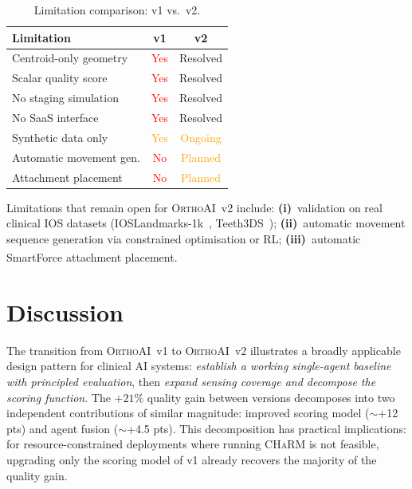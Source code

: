 \documentclass[10pt,twocolumn]{article}
\newcommand{\orthoai}{\textsc{OrthoAI}}
\newcommand{\charm}{\textsc{CHaRM}}
\newcommand{\vone}{\orthoai{}~v1}
\newcommand{\vtwo}{\orthoai{}~v2}
\begin{document}
\begin{table}[H]
\centering
\caption{Limitation comparison: v1 vs.\ v2.}
\label{tab:limitations}
\small
\begin{tabular}{p{2.8cm}cc}
\toprule
Limitation & v1 & v2 \\
\midrule
Centroid-only geometry    & \textcolor{red}{Yes} & \textcolor{green!60!black}{Resolved} \\
Scalar quality score      & \textcolor{red}{Yes} & \textcolor{green!60!black}{Resolved} \\
No staging simulation     & \textcolor{red}{Yes} & \textcolor{green!60!black}{Resolved} \\
No SaaS interface         & \textcolor{red}{Yes} & \textcolor{green!60!black}{Resolved} \\
Synthetic data only       & \textcolor{orange}{Yes} & \textcolor{orange}{Ongoing} \\
Automatic movement gen.   & \textcolor{red}{No} & \textcolor{orange}{Planned} \\
Attachment placement      & \textcolor{red}{No} & \textcolor{orange}{Planned} \\
\bottomrule
\end{tabular}
\end{table}

Limitations that remain open for \vtwo{} include:
\textbf{(i)}~validation on real clinical IOS datasets
(IOSLandmarks-1k~\cite{rodriguez2025charm}, Teeth3DS~\cite{benhamadou2022teeth3ds});
\textbf{(ii)}~automatic movement sequence generation via constrained
optimisation or RL;
\textbf{(iii)}~automatic SmartForce\textsuperscript{\textregistered} attachment
placement.

\section{Discussion}
\label{sec:discussion}

The transition from \vone{} to \vtwo{} illustrates a broadly applicable
design pattern for clinical AI systems: \textit{establish a working
single-agent baseline with principled evaluation}, then \textit{expand
sensing coverage and decompose the scoring function}.
The $+21\%$ quality gain between versions decomposes into two independent
contributions of similar magnitude: improved scoring model ($\sim$+12 pts)
and agent fusion ($\sim$+4.5 pts).
This decomposition has practical implications: for resource-constrained
deployments where running \charm{} is not feasible, upgrading only the
scoring model of v1 already recovers the majority of the quality gain.
\end{document}
